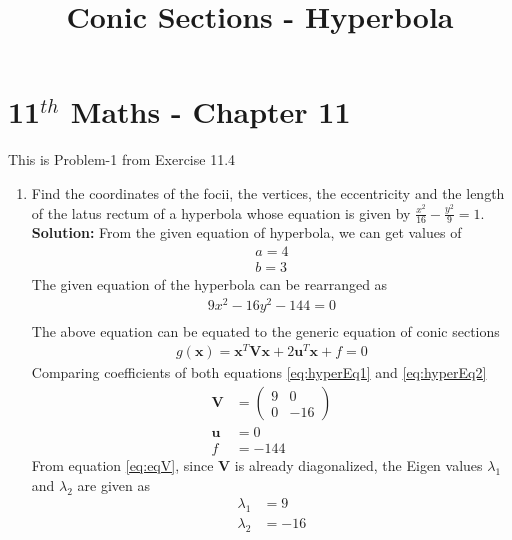 \documentclass[12pt]{article}
\providecommand{\brak}[1]{\ensuremath{\left(#1\right)}}
\newcommand{\solution}{\noindent \textbf{Solution: }}
\newcommand{\myvec}[1]{\ensuremath{\begin{pmatrix}#1\end{pmatrix}}}
\let\vec\mathbf
\begin{document}
\begin{center}
\title{\textbf{Conic Sections - Hyperbola}}
\date{\vspace{-5ex}} %
\maketitle
\end{center}
\setcounter{page}{1}

\section{11$^{th}$ Maths - Chapter 11}
This is Problem-1 from Exercise 11.4
\begin{enumerate}
	\item Find the coordinates of the focii, the vertices, the eccentricity and the length of the latus rectum of a hyperbola whose equation is given by $\frac{x^2}{16}-\frac{y^2}{9} = 1$. \\ 
\solution 
From the given equation of hyperbola, we can get values of
\begin{align}
    a = 4 \\
    b = 3
\end{align}
The given equation of the hyperbola can be rearranged as
\begin{align}
    \label{eq:hyperEq1}
    9x^2 - 16y^2-144 = 0 \\
\end{align}
The above equation can be equated to the generic equation of conic sections
\begin{align}
	\label{eq:hyperEq2}
	g\brak{\vec{x}} = \vec{x}^T\vec{V}\vec{x} + 2\vec{u}^T\vec{x} + f = 0 
\end{align}
Comparing coefficients of both equations \eqref{eq:hyperEq1} and \eqref{eq:hyperEq2} 
\begin{align}
	\label{eq:eqV}
	\vec{V} &= \myvec{ 9 & 0 \\ 0 & -16} \\
	\label{eq:eqU}
	\vec{u} &=  0 \\
	\label{eq:eqF}
	f &= -144 
\end{align}
From equation \eqref{eq:eqV}, since $\vec{V}$ is already diagonalized, the Eigen values $\lambda_1$ and $\lambda_2$ are given as 
\begin{align}
	\label{eq:eqEigen1}
	\lambda_1 &= 9 \\
	\label{eq:eqEigen2}
	\lambda_2 &= -16 
\end{align}
\begin{enumerate}

\end{enumerate}
\end{enumerate}
\end{document}
